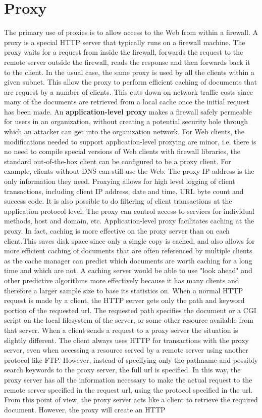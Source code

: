 \documentclass[11pt]{article}
\begin{document}
\section{Proxy}
The primary use of proxies is to allow access to the Web from within a firewall. A proxy is a special HTTP server that typically runs on a firewall machine. The proxy waits for a request from inside the firewall, forwards the request to the remote server outside the firewall, reads the response and then forwards back it to the client. In the usual case, the same proxy is used by all the clients within a given subnet. This allow the proxy to perform efficient caching of documents that are request by a number of clients. This cuts down on network traffic costs since many of the documents are retrieved from a local cache once the initial request has been made. An \textbf{application-level proxy} makes a firewall safely permeable for users in an organization, without creating a potential security hole through which an attacker can get into the organization network. For Web clients, the modifications needed to support application-level proxying are minor, i.e. there is no need to compile special versions of Web clients with firewall libraries, the standard out-of-the-box client can be configured to be a proxy client. For example, clients without DNS can still use the Web. The proxy IP address is the only information they need. Proxying allows for high level logging of client transactions, including client IP address, date and time, URL byte count and success code. It is also possible to do filtering of client transactions at the application protocol level. The proxy can control access to services for individual methods, host and domain, etc. Application-level proxy facilitates caching at the proxy. In fact, caching is more effective on the proxy server than on each client.This saves disk space since only a single copy is cached, and also allows for more efficient caching of documents that are often referenced by multiple clients as the cache manager can predict which documents are worth caching for a long time and which are not. A caching server would be able to use "look ahead" and other predictive algorithms more effectively because it has many clients and therefore a larger sample size to base its statistics on. When a normal HTTP request is made by a client, the HTTP server gets only the path and keyword portion of the requested url. The requested path specifies the document or a CGI script on the local filesystem of the server, or some other resource available from that server. When a client sends a request to a proxy server the situation is slightly different. The client always uses HTTP for transactions with the proxy server, even when accessing a resource served by a remote server using another protocol like FTP. However, instead of specifying only the pathname and possibly search keywords to the proxy server, the full url is specified. In this way, the proxy server has all the information necessary to make the actual request to the remote server specified in the request url, using the protocol specified in the url. From this point of view, the proxy server acts like a client to retrieve the required document. However, the proxy will create an HTTP 
\end{document}
